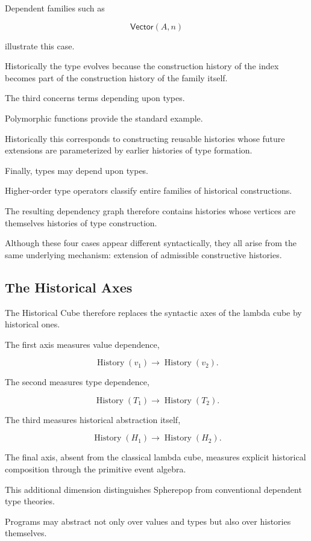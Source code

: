 \documentclass[12pt,oneside]{article}
\theoremstyle{definition}
\theoremstyle{remark}
\DeclareMathOperator{\History}{History}
\begin{document}
Dependent families such as

\[
\mathsf{Vector}(A,n)
\]

illustrate this case.

Historically the type evolves because the construction history of the index
becomes part of the construction history of the family itself.

The third concerns terms depending upon types.

Polymorphic functions provide the standard example.

Historically this corresponds to constructing reusable histories whose future
extensions are parameterized by earlier histories of type formation.

Finally, types may depend upon types.

Higher-order type operators classify entire families of historical
constructions.

The resulting dependency graph therefore contains histories whose vertices are
themselves histories of type construction.

Although these four cases appear different syntactically, they all arise from
the same underlying mechanism: extension of admissible constructive histories.

\subsection{The Historical Axes}

The Historical Cube therefore replaces the syntactic axes of the lambda cube by
historical ones.

The first axis measures value dependence,

\[
\History(v_1)
\longrightarrow
\History(v_2).
\]

The second measures type dependence,

\[
\History(T_1)
\longrightarrow
\History(T_2).
\]

The third measures historical abstraction itself,

\[
\History(H_1)
\longrightarrow
\History(H_2).
\]

The final axis, absent from the classical lambda cube, measures explicit
historical composition through the primitive event algebra.

This additional dimension distinguishes Spherepop from conventional dependent
type theories.

Programs may abstract not only over values and types but also over histories
themselves.
\end{document}
